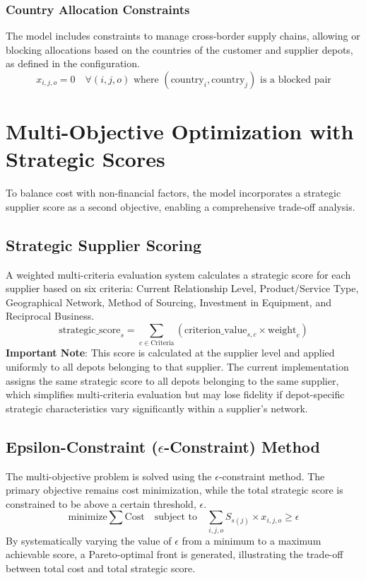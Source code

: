\subsubsection{Country Allocation Constraints}
The model includes constraints to manage cross-border supply chains, allowing or blocking allocations based on the countries of the customer and supplier depots, as defined in the configuration.
\begin{equation}
x_{i,j,o} = 0 \quad \forall (i,j,o) \text{ where } (\text{country}_i, \text{country}_j) \text{ is a blocked pair}
\end{equation}

\section{Multi-Objective Optimization with Strategic Scores}
To balance cost with non-financial factors, the model incorporates a strategic supplier score as a second objective, enabling a comprehensive trade-off analysis.

\subsection{Strategic Supplier Scoring}
A weighted multi-criteria evaluation system calculates a strategic score for each supplier based on six criteria: Current Relationship Level, Product/Service Type, Geographical Network, Method of Sourcing, Investment in Equipment, and Reciprocal Business.
\begin{equation}
\text{strategic\_score}_s = \sum_{c\in\text{Criteria}} (\text{criterion\_value}_{s,c} \times \text{weight}_c)
\end{equation}
\textbf{Important Note}: This score is calculated at the supplier level and applied uniformly to all depots belonging to that supplier. The current implementation assigns the same strategic score to all depots belonging to the same supplier, which simplifies multi-criteria evaluation but may lose fidelity if depot-specific strategic characteristics vary significantly within a supplier's network.

\subsection[Epsilon-Constraint Method]{Epsilon-Constraint ($\epsilon$-Constraint) Method}
The multi-objective problem is solved using the $\epsilon$-constraint method. The primary objective remains cost minimization, while the total strategic score is constrained to be above a certain threshold, $\epsilon$.
\begin{equation}
\text{minimize} \sum \text{Cost} \quad \text{subject to} \quad \sum_{i,j,o} S_{s(j)} \times x_{i,j,o} \ge \epsilon
\end{equation}
By systematically varying the value of $\epsilon$ from a minimum to a maximum achievable score, a Pareto-optimal front is generated, illustrating the trade-off between total cost and total strategic score.

